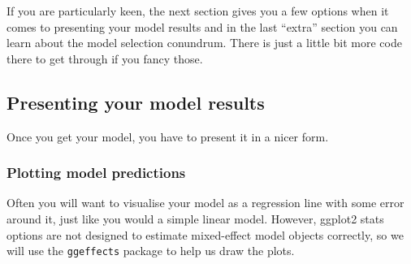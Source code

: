 \documentclass[
]{article}
\begin{document}
If you are particularly keen, the next section gives you a few options
when it comes to presenting your model results and in the last ``extra''
section you can learn about the model selection conundrum. There is just
a little bit more code there to get through if you fancy those.

\subsection{Presenting your model
results}\label{presenting-your-model-results}

Once you get your model, you have to present it in a nicer form.

\subsubsection{Plotting model
predictions}\label{plotting-model-predictions}

Often you will want to visualise your model as a regression line with
some error around it, just like you would a simple linear model.
However, ggplot2 stats options are not designed to estimate mixed-effect
model objects correctly, so we will use the \texttt{ggeffects} package
to help us draw the plots.
\end{document}
